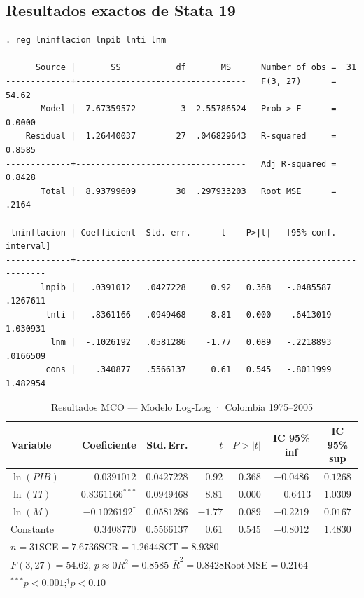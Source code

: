 \documentclass[12pt,a4paper]{article}
\begin{document}
\subsection{Resultados exactos de Stata 19}

\begin{statabox}
\begin{lstlisting}[style=Stata]
. reg lninflacion lnpib lnti lnm

      Source |       SS           df       MS      Number of obs =  31
-------------+----------------------------------   F(3, 27)      = 54.62
       Model |  7.67359572         3  2.55786524   Prob > F      = 0.0000
    Residual |  1.26440037        27  .046829643   R-squared     = 0.8585
-------------+----------------------------------   Adj R-squared = 0.8428
       Total |  8.93799609        30  .297933203   Root MSE      = .2164

 lninflacion | Coefficient  Std. err.      t    P>|t|   [95% conf. interval]
-------------+----------------------------------------------------------------
       lnpib |   .0391012   .0427228     0.92   0.368   -.0485587    .1267611
        lnti |   .8361166   .0949468     8.81   0.000    .6413019    1.030931
         lnm |  -.1026192   .0581286    -1.77   0.089   -.2218893    .0166509
       _cons |    .340877   .5566137     0.61   0.545   -.8011999    1.482954
\end{lstlisting}
\end{statabox}

\begin{table}[H]\centering
\caption{Resultados MCO --- Modelo Log-Log · Colombia 1975--2005}
\label{tab:mco}
\begin{tabular}{lrrrrcc}
\toprule
\textbf{Variable} & \textbf{Coeficiente} & \textbf{Std.\,Err.} & $t$ & $P>|t|$ &
IC 95\% inf & IC 95\% sup\\
\midrule
\rowcolor{gris_f}$\ln(PIB)$ & $\phantom{-}0.0391012$ & $0.0427228$ & $0.92$ & $0.368$
  & $-0.0486$ & $0.1268$\\
$\ln(TI)$ & $\phantom{-}0.8361166^{***}$ & $0.0949468$ & $8.81$ & $0.000$
  & $\phantom{-}0.6413$ & $1.0309$\\
\rowcolor{gris_f}$\ln(M)$ & $-0.1026192^{\dag}$ & $0.0581286$ & $-1.77$ & $0.089$
  & $-0.2219$ & $0.0167$\\
Constante & $\phantom{-}0.3408770$ & $0.5566137$ & $0.61$ & $0.545$
  & $-0.8012$ & $1.4830$\\
\midrule
\multicolumn{7}{l}{\small$n=31$\quad SCE$=7.6736$\quad SCR$=1.2644$\quad SCT$=8.9380$}\\
\multicolumn{7}{l}{\small$F(3,27)=54.62$, $p\approx0$\quad$R^2=0.8585$\quad
  $\bar R^2=0.8428$\quad Root\,MSE$=0.2164$}\\
\multicolumn{7}{l}{\footnotesize$^{***}p<0.001$;\quad$^{\dag}p<0.10$}\\
\bottomrule
\end{tabular}
\end{table}
\end{document}
